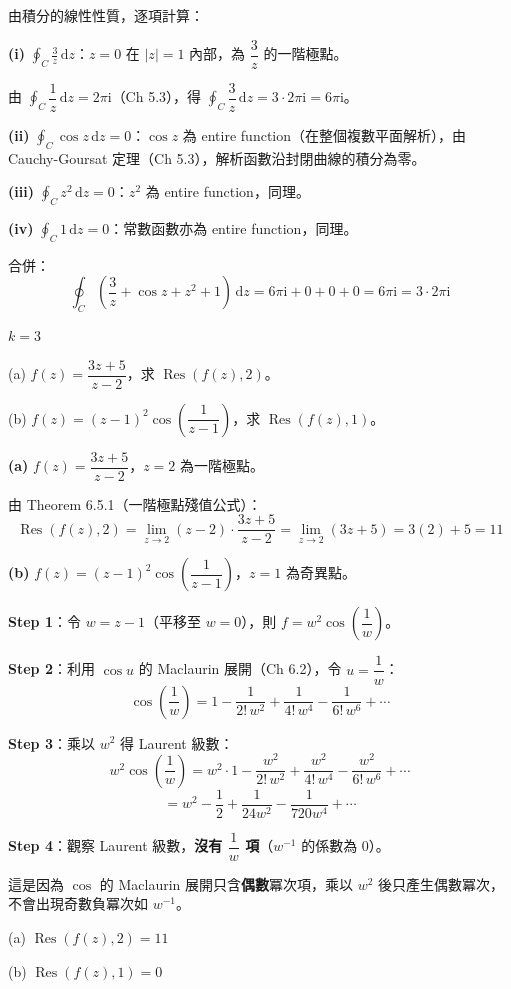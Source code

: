 \documentclass[12pt,a4paper]{article}
\newcommand{\dd}{\,\mathrm{d}}
\newcommand{\ii}{\mathrm{i}}
\newcommand{\Res}{\operatorname{Res}}
\begin{document}
\begin{solbox}[解]
由積分的線性性質，逐項計算：

\textbf{(i)} $\displaystyle\oint_C\frac{3}{z}\dd{z}$：$z=0$ 在 $|z|=1$ 內部，為 $\dfrac{3}{z}$ 的一階極點。

由 $\oint_C\dfrac{1}{z}\dd{z}=2\pi\ii$（Ch 5.3），得 $\oint_C\dfrac{3}{z}\dd{z}=3\cdot 2\pi\ii=6\pi\ii$。

\textbf{(ii)} $\displaystyle\oint_C\cos z\dd{z}=0$：$\cos z$ 為 entire function（在整個複數平面解析），由 Cauchy-Goursat 定理（Ch 5.3），解析函數沿封閉曲線的積分為零。

\textbf{(iii)} $\displaystyle\oint_C z^2\dd{z}=0$：$z^2$ 為 entire function，同理。

\textbf{(iv)} $\displaystyle\oint_C 1\dd{z}=0$：常數函數亦為 entire function，同理。

合併：
$$\oint_C\left(\frac{3}{z}+\cos z+z^2+1\right)\dd{z}=6\pi\ii+0+0+0=6\pi\ii=3\cdot 2\pi\ii$$
\end{solbox}

\begin{ansbox}
$k=\boxed{3}$
\end{ansbox}

\begin{qbox}[第 14 題\,---\,殘值計算]
(a) $f(z)=\dfrac{3z+5}{z-2}$，求 $\Res(f(z),2)$。

(b) $f(z)=(z-1)^2\cos\!\left(\dfrac{1}{z-1}\right)$，求 $\Res(f(z),1)$。
\end{qbox}

\begin{solbox}[解]
\textbf{(a)} $f(z)=\dfrac{3z+5}{z-2}$，$z=2$ 為一階極點。

由 Theorem 6.5.1（一階極點殘值公式）：
$$\Res(f(z),2)=\lim_{z\to 2}(z-2)\cdot\frac{3z+5}{z-2}=\lim_{z\to 2}(3z+5)=3(2)+5=11$$

\textbf{(b)} $f(z)=(z-1)^2\cos\!\left(\dfrac{1}{z-1}\right)$，$z=1$ 為奇異點。

\textbf{Step 1}：令 $w=z-1$（平移至 $w=0$），則 $f=w^2\cos\!\left(\dfrac{1}{w}\right)$。

\textbf{Step 2}：利用 $\cos u$ 的 Maclaurin 展開（Ch 6.2），令 $u=\dfrac{1}{w}$：
$$\cos\!\left(\frac{1}{w}\right)=1-\frac{1}{2!\,w^2}+\frac{1}{4!\,w^4}-\frac{1}{6!\,w^6}+\cdots$$

\textbf{Step 3}：乘以 $w^2$ 得 Laurent 級數：
$$w^2\cos\!\left(\frac{1}{w}\right)=w^2\cdot 1-\frac{w^2}{2!\,w^2}+\frac{w^2}{4!\,w^4}-\frac{w^2}{6!\,w^6}+\cdots$$
$$=w^2-\frac{1}{2}+\frac{1}{24w^2}-\frac{1}{720w^4}+\cdots$$

\textbf{Step 4}：觀察 Laurent 級數，\textbf{沒有 $\dfrac{1}{w}$ 項}（$w^{-1}$ 的係數為 $0$）。

這是因為 $\cos$ 的 Maclaurin 展開只含\textbf{偶數}冪次項，乘以 $w^2$ 後只產生偶數冪次，不會出現奇數負冪次如 $w^{-1}$。
\end{solbox}

\begin{ansbox}
(a) $\Res(f(z),2)=\boxed{11}$

(b) $\Res(f(z),1)=\boxed{0}$
\end{ansbox}
\end{document}
